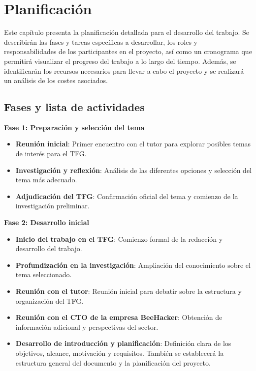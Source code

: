 \documentclass[a4paper, 10pt]{article}
\begin{document}
\clearpage

\section{Planificación}
Este capítulo presenta la planificación detallada para el desarrollo del trabajo. Se describirán las fases y tareas específicas a desarrollar, los roles y responsabilidades de los participantes en el proyecto, así como un cronograma que permitirá visualizar el progreso del trabajo a lo largo del tiempo. Además, se identificarán los recursos necesarios para llevar a cabo el proyecto y se realizará un análisis de los costes asociados.

\subsection{Fases y lista de actividades}

\textbf{Fase 1: Preparación y selección del tema}
\begin{itemize}
    \item \textbf{Reunión inicial}: Primer encuentro con el tutor para explorar posibles temas de interés para el TFG.
    \item \textbf{Investigación y reflexión}: Análisis de las diferentes opciones y selección del tema más adecuado.
    \item \textbf{Adjudicación del TFG}: Confirmación oficial del tema y comienzo de la investigación preliminar.
\end{itemize}

\vspace{0.5cm}

\textbf{Fase 2: Desarrollo inicial}
\begin{itemize}
    \item \textbf{Inicio del trabajo en el TFG}: Comienzo formal de la redacción y desarrollo del trabajo.
    \item \textbf{Profundización en la investigación}: Ampliación del conocimiento sobre el tema seleccionado.
    \item \textbf{Reunión con el tutor}: Reunión inicial para debatir sobre la estructura y organización del TFG.
    \item \textbf{Reunión con el CTO de la empresa BeeHacker}: Obtención de información adicional y perspectivas del sector.
    \item \textbf{Desarrollo de introducción y planificación}: Definición clara de los objetivos, alcance, motivación y requisitos. También se establecerá la estructura general del documento y la planificación del proyecto.
\end{itemize}
\end{document}
